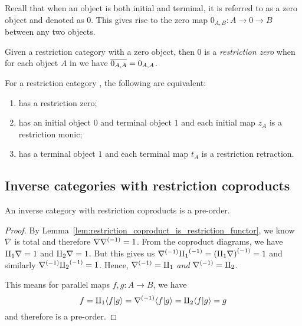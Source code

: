 Recall that when an object is both initial and terminal, it is referred to as a zero object and
denoted as $0$. This gives rise to the zero map $0_{A,B}: A \to 0 \to B$ between any two objects.

\begin{definition}\label{def:restriction_zero}
  Given a restriction category \X with a zero object, then $0$ is a \emph{restriction zero} when
  for each object $A$ in \X we have $\overline{0_{A,A}} = 0_{A,A}$.
\end{definition}

\begin{lemma}\label{lem:restriction_zero_equivalences}
  For a restriction category \X, the following are equivalent:
  \begin{enumerate}[{(}i{)}]
    \item \X has a restriction zero;
    \item \X has an initial object $0$ and terminal object $1$ and each initial map $z_A$ is a
      restriction monic;
    \item \X has a terminal object $1$ and each terminal map $t_A$ is a restriction retraction.
  \end{enumerate}
\end{lemma}




\subsection{Inverse categories with restriction coproducts} %
\label{sub:inverse_categories_with_restriction_coproducts}


\begin{proposition}
  An inverse category \X with restriction coproducts is a pre-order.
\end{proposition}
\begin{proof}
  By Lemma~\ref{lem:restriction_coproduct_is_restriction_functor}, we know $\nabla$ is total and
  therefore $\nabla{\nabla}^{(-1)} = 1$. From the coproduct diagrams, we have $\amalg_{1}\nabla =1$ and
  $\amalg_{2}\nabla = 1$. But this gives us ${\nabla}^{(-1)}{\amalg_{1}}^{(-1)} = {(\amalg_{1}\nabla)}^{(-1)} = 1$ and
  similarly ${\nabla}^{(-1)}{\amalg_{2}}^{(-1)} =1$. Hence, ${\nabla}^{(-1)} = \amalg_{1}$ \emph{and} ${\nabla}^{(-1)} =
  \amalg_{2}$.

  This means for parallel maps $f,g:A \to B$, we have
  \[
    f = \amalg_{1} \langle f|g\rangle = {\nabla}^{(-1)} \langle f|g\rangle = \amalg_{2}\langle f|g\rangle = g
  \]
  and therefore \X is a pre-order.
\end{proof}

